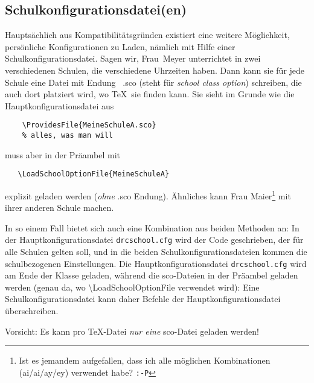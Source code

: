 \documentclass[hyperworksheet]{drcschool}
\newcommand*{\cs}[1]{\textup{\ttfamily\textbackslash#1}}                   %
\newcommand*{\opt}[1]{\textup{\ttfamily#1}}                                %
\begin{document}
\subsection{Schulkonfigurationsdatei(en)}
Hauptsächlich aus Kompatibilitätsgründen existiert eine weitere Möglichkeit,
persönliche Konfigurationen zu Laden, nämlich mit Hilfe einer
Schulkonfigurationsdatei. Sagen wir, Frau~Meyer unterrichtet in zwei verschiedenen
Schulen, die verschiedene Uhrzeiten haben. Dann kann sie für jede Schule eine
Datei mit Endung ~\opt{.sco} (steht für \emph{school class option}) schreiben,
die auch dort platziert wird, wo \TeX\ sie finden kann. Sie sieht im Grunde
wie die Hauptkonfigurationsdatei aus
\begin{verbatim}
    \ProvidesFile{MeineSchuleA.sco}
    % alles, was man will
\end{verbatim}
muss aber in der Präambel mit
\begin{verbatim}
   \LoadSchoolOptionFile{MeineSchuleA}
\end{verbatim}
explizit geladen werden (\emph{ohne} \opt{.sco} Endung). Ähnliches
kann Frau Maier\footnote{Ist es jemandem aufgefallen, dass ich alle möglichen Kombinationen (ai/ai/ay/ey) verwendet habe? \texttt{:-P}}
mit ihrer anderen Schule machen.

In so einem Fall bietet sich auch eine Kombination aus beiden Methoden an:
In der Hauptkonfigurationsdatei \texttt{drcschool.cfg} wird der Code geschrieben,
der für
alle Schulen gelten soll, und in die beiden Schulkonfigurationsdateien
kommen die schulbezogenen
Einstellungen.
Die Hauptkonfigurationsdatei \texttt{drcschool.cfg}
wird am Ende der Klasse geladen, während die \opt{sco}-Dateien
in der Präambel geladen werden (genau da, wo \cs{LoadSchoolOptionFile} verwendet wird):
Eine Schulkonfigurationsdatei kann daher Befehle der Hauptkonfigurationsdatei
überschreiben.

Vorsicht: Es kann pro \TeX-Datei \emph{nur eine} \opt{sco}-Datei geladen werden!

\end{document}
